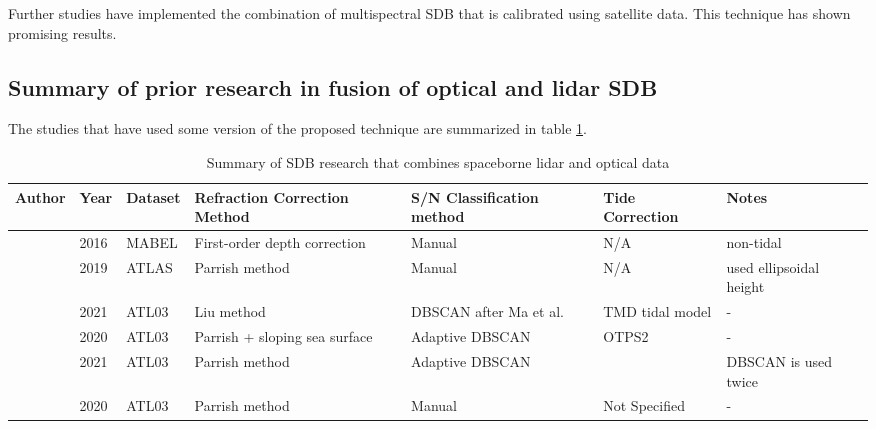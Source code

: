 Further studies have implemented the combination of multispectral SDB that is calibrated using satellite data. This technique has shown promising results.

\subsection{Summary of prior research in fusion of optical and lidar SDB}

The studies that have used some version of the proposed technique are summarized in table \ref{research-summary}.
\begin{landscape}
      \begin{table}
            \label{research-summary}
            \caption{Summary of SDB research that combines spaceborne lidar and optical data}
            \raggedright
            \begin{tabular}{lllp{3cm}p{3cm}ll}
                  \midrule
                  Author                                               & Year & Dataset & Refraction Correction Method  & S/N Classification method      & Tide Correction & Notes                        \\
                  \hline
                  \citeauthor{Forfinski-Sarkozi2016} & 2016 & MABEL   & First-order depth correction  & Manual                         & N/A             & non-tidal                    \\
                  \citeauthor{Parrish2019}                    & 2019 & ATLAS   & Parrish method                & Manual                         & N/A             & used  ellipsoidal height     \\
                  \citeauthor{Liu2021}                             & 2021 & ATL03   & Liu method                    & DBSCAN after Ma et al.         & TMD tidal model & -                            \\
                  \citeauthor{Ma2020}                             & 2020 & ATL03   & Parrish + sloping sea surface & Adaptive DBSCAN                & OTPS2           & -                            \\
                  \citeauthor{Xie2021}                            & 2021 & ATL03   & Parrish method                & Adaptive DBSCAN                &                 & DBSCAN  is used twice        \\
                  \citeauthor{Thomas2021d}                     & 2020 & ATL03   & Parrish method                & Manual                         & Not Specified   & -                            \\

\end{tabular}
\end{table}
\end{landscape}
